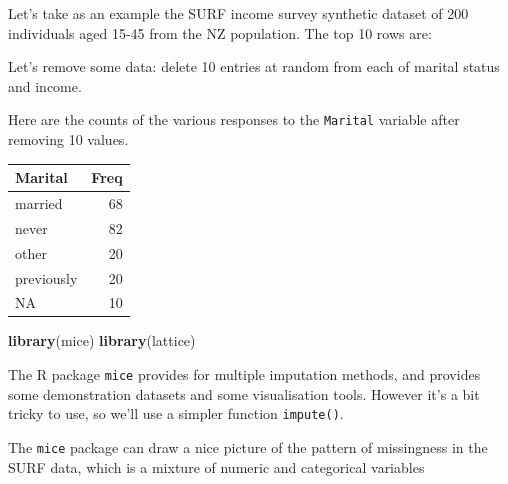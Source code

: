 \documentclass[
]{book}
\newenvironment{Shaded}{\begin{snugshade}}{\end{snugshade}}
\newcommand{\ConstantTok}[1]{\textcolor[rgb]{0.56,0.35,0.01}{#1}}
\newcommand{\DecValTok}[1]{\textcolor[rgb]{0.00,0.00,0.81}{#1}}
\newcommand{\FunctionTok}[1]{\textcolor[rgb]{0.13,0.29,0.53}{\textbf{#1}}}
\newcommand{\NormalTok}[1]{#1}
\newcommand{\OtherTok}[1]{\textcolor[rgb]{0.56,0.35,0.01}{#1}}
\newcommand{\SpecialCharTok}[1]{\textcolor[rgb]{0.81,0.36,0.00}{\textbf{#1}}}
\begin{document}
Let's take as an example the SURF income survey synthetic dataset of 200 individuals
aged 15-45 from the NZ population. The top 10 rows are:

Let's remove some data: delete 10 entries at random from each of marital status and income.

\begin{Shaded}
\end{Shaded}

Here are the counts of the various responses to the \texttt{Marital} variable after
removing 10 values.

\begin{table}
\centering
\begin{tabular}[t]{l|r}
\hline
Marital & Freq\\
\hline
married & 68\\
\hline
never & 82\\
\hline
other & 20\\
\hline
previously & 20\\
\hline
NA & 10\\
\hline
\end{tabular}
\end{table}

\begin{Shaded}
\begin{Highlighting}[]
\FunctionTok{library}\NormalTok{(mice)}
\FunctionTok{library}\NormalTok{(lattice)}
\end{Highlighting}
\end{Shaded}

The R package \texttt{mice} provides for multiple imputation methods, and provides some
demonstration datasets and some visualisation tools. However it's a bit tricky to use,
so we'll use a simpler function \texttt{impute()}.

The \texttt{mice} package can draw a nice picture of the pattern of missingness in the
SURF data, which is a mixture of numeric and categorical variables
\end{document}
